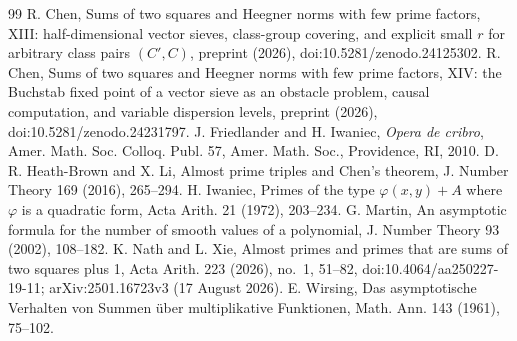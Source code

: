 \documentclass[11pt,a4paper]{amsart}
\theoremstyle{remark}
\numberwithin{equation}{section}
\begin{document}
\begin{thebibliography}{99}
 R. Chen, Sums of two squares and Heegner norms with few prime factors, XIII: half-dimensional
vector sieves, class-group covering, and explicit small $r$ for arbitrary class pairs $(C',C)$, preprint (2026),
doi:10.5281/zenodo.24125302.
 R. Chen, Sums of two squares and Heegner norms with few prime factors, XIV: the Buchstab fixed
point of a vector sieve as an obstacle problem, causal computation, and variable dispersion levels, preprint (2026),
doi:10.5281/zenodo.24231797.
 J. Friedlander and H. Iwaniec, \emph{Opera de cribro}, Amer. Math. Soc. Colloq. Publ. 57, Amer. Math.
Soc., Providence, RI, 2010.
 D. R. Heath-Brown and X. Li, Almost prime triples and Chen's theorem, J. Number Theory 169 (2016),
265--294.
 H. Iwaniec, Primes of the type $\varphi(x,y)+A$ where $\varphi$ is a quadratic form, Acta Arith. 21
(1972), 203--234.
 G. Martin, An asymptotic formula for the number of smooth values of a polynomial, J. Number Theory
93 (2002), 108--182.
 K. Nath and L. Xie, Almost primes and primes that are sums of two squares plus 1, Acta Arith. 223
(2026), no.~1, 51--82, doi:10.4064/aa250227-19-11; arXiv:2501.16723v3 (17 August 2026).
 E. Wirsing, Das asymptotische Verhalten von Summen \"uber multiplikative Funktionen, Math. Ann.
143 (1961), 75--102.
\end{thebibliography}
\end{document}
